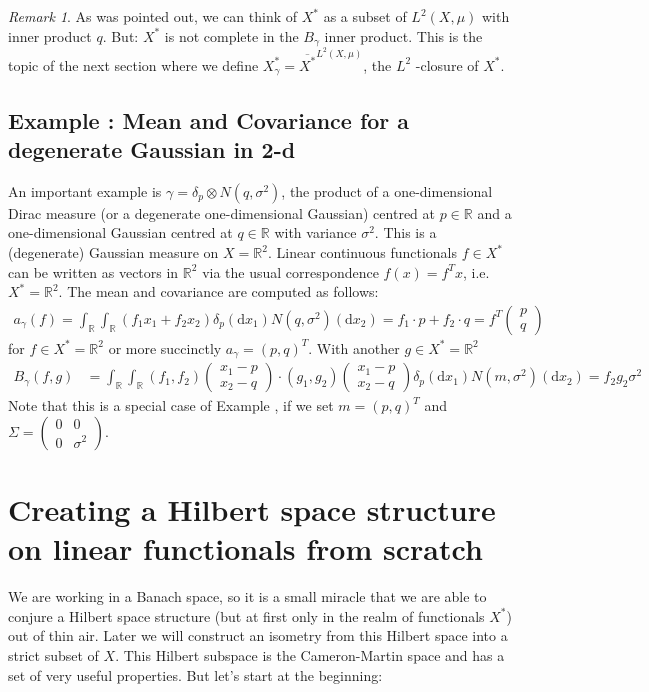 \documentclass{scrartcl}
\theoremstyle{definition}
\theoremstyle{remark}
\newtheorem{remark}{Remark}
\newcommand{\de}{\mathrm d}
\newcommand{\R}{\mathbb R}
\newcommand*\circled[1]{\tikz[baseline=(char.base)]{
            \node[shape=circle,draw,inner sep=2pt] (char) {#1};}}
\DeclareRobustCommand{\myboxtwo}[2][blue!20]{%
\begin{tcolorbox}[   %
        breakable,
        left=0pt,
        right=0pt,
        top=0pt,
        bottom=0pt,
        colback=#1,
        colframe=#1,
        width=\dimexpr\textwidth\relax, 
        enlarge left by=0mm,
        boxsep=5pt,
        arc=10pt,outer arc=10pt,
        ]
        #2
\end{tcolorbox}
}
\begin{document}
{\begin{remark}
As was pointed out, we can think of $X^*$ as a subset of $L^2(X,\mu)$ with inner product $q$. But: $X^*$ is not complete in the $B_\gamma$ inner product. This is the topic of the next section where we define $X_\gamma^* = \overline{X^*}^{L^2(X,\mu)}$, the $L^2$ -closure of $X^*$.
\end{remark}
 
}

\myboxtwo{
\subsection*{Example \circled{3}: Mean and Covariance for a degenerate Gaussian in 2-d}
An important example is $\gamma = \delta_p \otimes N(q, \sigma^2)$, the product of a one-dimensional Dirac measure (or a degenerate one-dimensional Gaussian) centred at $p\in\R$ and a one-dimensional Gaussian centred at $q\in\R$ with variance $\sigma^2$. This is a (degenerate) Gaussian measure on $X=\R^2$. Linear continuous functionals $f\in X^*$ can be written as vectors in $\R^2$ via the usual correspondence $f(x) = f^Tx$, i.e. $X^* = \R^2$. The mean and covariance are computed as follows:
\begin{align*}
a_\gamma(f) = \int_\R\int_\R (f_1x_1+f_2x_2) \delta_p(\de x_1) N(q, \sigma^2)(\de x_2) = f_1\cdot p + f_2\cdot q = f^T \begin{pmatrix}
p\\q
\end{pmatrix}
\end{align*}
for $f\in X^*=\R^2$ or more succinctly $a_\gamma = (p,q)^T$. With another $g\in X^*=\R^2$
\begin{align*}
B_\gamma(f,g) &= \int_\R\int_\R  (f_1,f_2)\begin{pmatrix}
x_1-p\\x_2-q
\end{pmatrix}\cdot (g_1,g_2)\begin{pmatrix}
x_1-p\\x_2-q
\end{pmatrix} \delta_p(\de x_1) N(m,\sigma^2)(\de x_2) = f_2g_2\sigma^2
\end{align*}
Note that this is a special case of Example \circled{1}, if we set $m = (p,q)^T$ and $\Sigma = \begin{pmatrix}
0&0\\0&\sigma^2
\end{pmatrix}$.
}
\section{Creating a Hilbert space structure on linear functionals from scratch}\label{sec:rkhs}
We are working in a Banach space, so it is a small miracle that we are able to conjure a Hilbert space structure (but at first only in the realm of functionals $X^*$) out of thin air. Later we will construct an isometry from this Hilbert space into a strict subset of $X$. This Hilbert subspace is the Cameron-Martin space and has a set of very useful properties. But let's start at the beginning:
\end{document}
